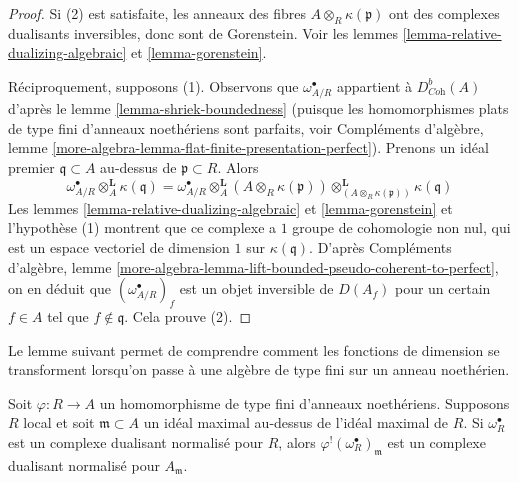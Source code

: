 \begin{proof}
Si (2) est satisfaite, les anneaux des fibres $A \otimes_R \kappa(\mathfrak p)$
ont des complexes dualisants inversibles, donc sont de Gorenstein.
Voir les lemmes \ref{lemma-relative-dualizing-algebraic} et \ref{lemma-gorenstein}.

\medskip\noindent
Réciproquement, supposons (1).
Observons que $\omega_{A/R}^\bullet$ appartient à $D^b_{\textit{Coh}}(A)$ d'après le lemme \ref{lemma-shriek-boundedness}
(puisque les homomorphismes plats de type fini d'anneaux noethériens
sont parfaits, voir Compléments d'algèbre, lemme \ref{more-algebra-lemma-flat-finite-presentation-perfect}).
Prenons un idéal premier $\mathfrak q \subset A$ au-dessus de $\mathfrak p \subset R$. Alors
$$
\omega_{A/R}^\bullet \otimes_A^\mathbf{L} \kappa(\mathfrak q) =
\omega_{A/R}^\bullet \otimes_A^\mathbf{L}
(A \otimes_R \kappa(\mathfrak p))
\otimes_{(A \otimes_R \kappa(\mathfrak p))}^\mathbf{L}
\kappa(\mathfrak q)
$$
Les lemmes \ref{lemma-relative-dualizing-algebraic} et \ref{lemma-gorenstein} et l'hypothèse (1) montrent que ce complexe
a $1$ groupe de cohomologie non nul,
qui est un espace vectoriel de dimension $1$ sur $\kappa(\mathfrak q)$.
D'après Compléments d'algèbre, lemme \ref{more-algebra-lemma-lift-bounded-pseudo-coherent-to-perfect},
on en déduit que $(\omega_{A/R}^\bullet)_f$ est un objet inversible de $D(A_f)$
pour un certain $f \in A$ tel que $f \not \in \mathfrak q$.
Cela prouve (2).
\end{proof}

\noindent
Le lemme suivant permet de comprendre comment les fonctions de dimension
se transforment lorsqu'on passe à une algèbre de type fini sur un anneau noethérien.

\begin{lemma}
\label{lemma-shriek-normalized}
Soit $\varphi : R \to A$ un homomorphisme de type fini d'anneaux noethériens.
Supposons $R$ local et soit $\mathfrak m \subset A$ un idéal maximal au-dessus
de l'idéal maximal de $R$.
Si $\omega_R^\bullet$ est un complexe dualisant normalisé pour $R$,
alors $\varphi^!(\omega_R^\bullet)_\mathfrak m$ est un complexe dualisant normalisé pour $A_\mathfrak m$.
\end{lemma}

